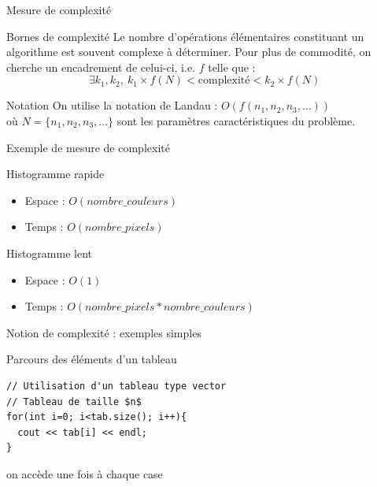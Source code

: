 \begin{frame}{Mesure de complexité}

\begin{block}{Bornes de complexité}
    Le nombre d'opérations élémentaires constituant un algorithme est souvent complexe à déterminer. Pour plus de commodité, on cherche un encadrement de celui-ci, i.e. $f$ telle que :
\begin{equation}
\exists k_1, k_2,~k_1 \times f(N) < \text{complexité} < k_2 \times f(N)
\end{equation}
\end{block}

\begin{block}{Notation}
    On utilise la notation de Landau : $O(f(n_1, n_2, n_3, \hdots))$\\
    où $N = \{n_1, n_2, n_3, \hdots\}$ sont les paramètres caractéristiques du problème.
\end{block}
\end{frame}

\begin{frame}{Exemple de mesure de complexité}
\begin{exampleblock}{Histogramme rapide}
  \begin{itemize}
    \item Espace : $O(nombre\_couleurs)$
    \item Temps : $O(nombre\_pixels)$
  \end{itemize}
\end{exampleblock}

\begin{exampleblock}{Histogramme lent}
    \begin{itemize}
        \item Espace : $O(1)$
        \item Temps : $O(nombre\_pixels * nombre\_couleurs)$
    \end{itemize}
\end{exampleblock}
\end{frame}

\begin{frame}[fragile]{Notion de complexité : exemples simples}
\begin{exampleblock}{Parcours des éléments d'un tableau}
\begin{verbatim}
// Utilisation d'un tableau type vector
// Tableau de taille $n$
for(int i=0; i<tab.size(); i++){
  cout << tab[i] << endl;
}
\end{verbatim}
on accède une fois à chaque case 
\end{exampleblock}
\end{frame}

